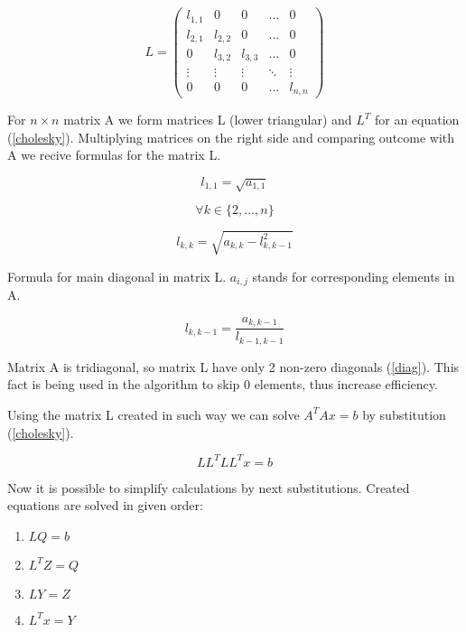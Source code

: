 \documentclass[12pt]{article}
\begin{document}
\begin{equation}
L=\begin{pmatrix}
l_{1,1} & 0 & 0 & \ldots & 0 \\
l_{2,1} & l_{2,2} & 0 & \ldots & 0 \\
0 & l_{3,2} & l_{3,3} & \ldots & 0 \\
\vdots & \vdots & \vdots & \ddots & \vdots \\
0 & 0 & 0 & \ldots & l_{n,n}
\end{pmatrix}
\end{equation}

For $n\times n$ matrix A we form matrices L (lower triangular) and $L^{T}$ for an equation (\ref{cholesky}). Multiplying matrices on the right side and comparing outcome with A we recive formulas for the matrix L.

\begin{equation*}
l_{1,1} = \sqrt{a_{1,1}}
\end{equation*}

\[
\forall k \in \{2,...,n\}
\]

\begin{equation*}
l_{k,k} = \sqrt{a_{k,k} - l_{k,k-1}^{2}} \label{maindiag}
\end{equation*}

\medskip Formula for main diagonal in matrix L. $a_{i,j}$ stands for corresponding elements in A.

\begin{equation*}
l_{k,k-1} = \frac{a_{k,k-1}}{l_{k-1,k-1}} \label{diag}
\end{equation*}

\medskip Matrix A is tridiagonal, so matrix L have only 2 non-zero diagonals (\ref{diag}). This fact is being used in the algorithm to skip 0 elements, thus increase efficiency.

Using the matrix L created in such way we can solve  $A^{T}Ax = b$ by substitution (\ref{cholesky}).

\begin{equation*}
LL^{T}LL^{T}x = b
\end{equation*}

Now it is possible to simplify calculations by next substitutions. Created equations are solved in given order:
\medskip
\begin{enumerate}
	\item{$LQ = b$}
	\item{$L^{T}Z = Q$}
	\item{$LY = Z$}
	\item{$L^{T}x = Y$} 
\end{enumerate}
\end{document}
